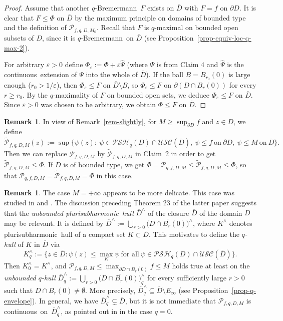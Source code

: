 \documentclass[reqno]{amsart}
\theoremstyle{definition}
\newtheorem{rem}[thm]{Remark}
\numberwithin{equation}{section}
\newcommand{\pcal}{\mathcal{P}}
\newcommand{\USC}{\mathcal{USC}}
\newcommand{\qbrem}{$q$-Bremermann}
\newcommand{\psh}{pluri\-sub\-harmonic}
\newcommand{\PSH}{\mathcal{PSH}}
\newcommand{\cl}[1]{\overline{#1}}
\newcommand{\cont}{continuous}
\newcommand{\cld}{\overline{D}}
\newcommand{\eps}{\varepsilon}
\begin{document}
\begin{proof}
\medskip

Assume that another \qbrem\ $F$ exists on $\cld$ with $F=f$ on $\partial D$. It is clear that $F \leq \Phi$ on $\cld$ by the maximum principle on domains of bounded type and the definition of $\pcal_{f,q,D,M_0}$. Recall that $F$ is $q$-maximal on bounded open subsets of $D$, since it is \qbrem\ on $\cld$ (see Proposition~\ref{prop-equiv-loc-q-max-2}).

For arbitrary $\eps>0$ define $\Phi_\eps:=\Phi+\eps \widehat{\Psi}$ (where $\Psi$ is from Claim 4 and $\widehat{\Psi}$ is the \cont\ extension of $\Psi$ into the whole of $\cld$). If the ball $B=B_{r_0}(0)$ is large enough ($r_0>1/\eps$), then $\Phi_\eps \leq F$ on $\cld \setminus B$, so $\Phi_\eps \leq F$ on $\partial(D \cap B_r(0))$ for every $r \geq r_0$. By the $q$-maximality of $F$ on bounded open sets, we deduce $\Phi_\eps \leq F$ on $\cld$. Since $\eps>0$ was chosen to be arbitrary, we obtain $\Phi \leq F$ on $\cld$.
\end{proof}

\begin{rem} In view of Remark~\ref{rem-slightly}, for $M \geq \sup_{\partial D}f$ and $z \in D$, we define 
\[
\widetilde{\pcal}_{f,q,D,M}(z):=\sup\{\psi(z) : \ \psi \in \PSH_q(D)\cap \USC(\cld), \ \psi \leq f \ \text{on}\ \partial D, \ \psi \leq M \ \text{on}\ \cld\}.
\]
Then we can replace $\pcal_{f,q,D,M}$ by $\widetilde{\pcal}_{f,q,D,M}$ in Claim~2 in order to get $\widetilde{\pcal}_{f,q,D,M} \leq \Phi$. If $D$ is of bounded type, we get $\Phi=\pcal_{q,f,D,M}\leq \widetilde{\pcal}_{f,q,D,M} \leq \Phi$, so that $\pcal_{q,f,D,M} = \widetilde{\pcal}_{f,q,D,M}=\Phi$ in this case. 
\end{rem}

\begin{rem}
The case $M=+\infty$ appears to be more delicate. This case was studied in \cite{NH} and \cite{SiTo}. The discussion preceding Theorem 23 of the latter paper suggests that the \textit{unbounded \psh\ hull} $\cld^{\wedge}$ of the closure $\cld$ of the domain $D$ may be relevant. It is defined by
$\cld^{\wedge} := \bigcup_{r>0} \big(\cl{D \cap B_r(0)}\big)^{\wedge}$, where $K^{\wedge}$ denotes \psh\ hull of a compact set $K \subset \cld$. This motivates to define the \textit{$q$-hull} of $K$ in $\cld$ via
\[
K^{\wedge}_q := \{ z \in \cld : \psi(z) \leq \max_{K} \psi \ \text{for\ all}\ \psi \in \PSH_q(D)\cap\USC(\cld)\}.
\]
Then $K^\wedge_0=K^\wedge$, and $\pcal_{f,q,D,M} \leq \max_{\partial D \cap \cl{B_r(0)}} f \leq M$ holds true at least on the \textit{unbounded $q$-hull} $\cld^{\wedge}_q := \bigcup_{r>0} \big(\cl{D \cap B_r(0)}\big)^{\wedge}_q$ for every sufficiently large $r>0$ such that $D \cap B_r(0)\neq \emptyset$. More precisely, $\cld^{\wedge}_q \subseteq \cld \setminus E_\infty$ (see Proposition~\ref{prop-q-envelope}). In general, we have $\cld^{\wedge}_q \subsetneq \cld$, but it is not immediate that $\pcal_{f,q,D,M}$ is \cont\ on~$\cld^{\wedge}_q$, as pointed out in \cite{SiTo} in the case $q=0$.
\end{rem}
\end{document}
